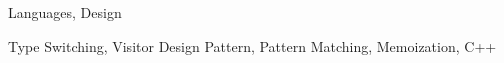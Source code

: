 \documentclass[preprint]{sigplanconf}
\begin{document}
\begin{abstract}
%
\end{abstract}


\terms
Languages, Design

\keywords
Type Switching, Visitor Design Pattern, Pattern Matching, Memoization, C++









%

%











\end{document}
